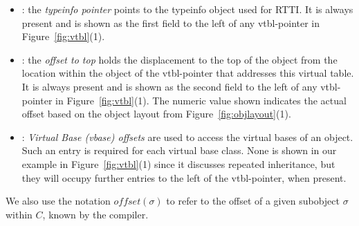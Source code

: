 \begin{itemize}
\setlength{\itemsep}{0pt}
\setlength{\parskip}{0pt}
\item {}: the \emph{typeinfo pointer} points to the typeinfo 
      object used for RTTI. It is always present and is shown as the first field 
      to the left of any vtbl-pointer in Figure~\ref{fig:vtbl}(1).
\item {}: the \emph{offset to top} holds the displacement to 
      the top of the object from the location within the object of the 
      vtbl-pointer that addresses this virtual table. It is always present and 
      is shown as the second field to the left of any vtbl-pointer in 
      Figure~\ref{fig:vtbl}(1). The numeric value shown indicates the actual 
      offset based on the object layout from Figure~\ref{fig:objlayout}(1).
\item {}: \emph{Virtual Base (vbase) offsets} are used to access 
      the virtual bases of an object. Such an entry is required for each virtual 
      base class. None is shown in our example in Figure~\ref{fig:vtbl}(1) 
      since it discusses repeated inheritance, but they will occupy further 
      entries to the left of the vtbl-pointer, when present.
\end{itemize}

\noindent
We also use the notation $\mathit{offset}(\sigma)$ to refer to the offset of a 
given subobject $\sigma$ within $C$, known by the compiler.

